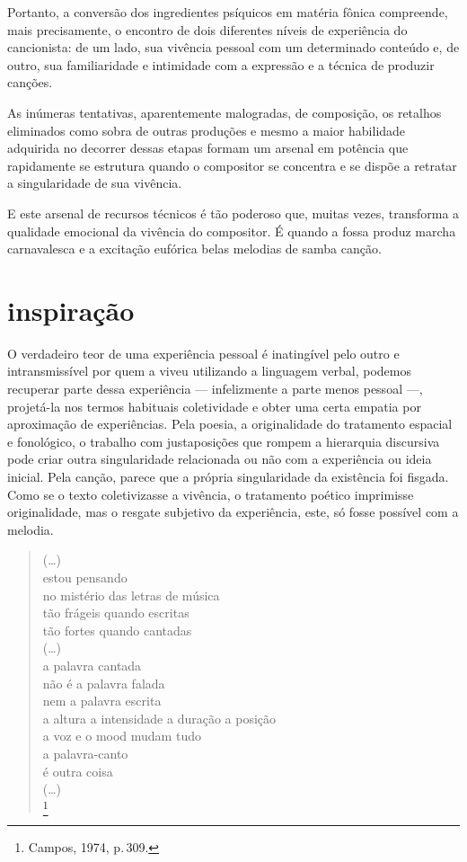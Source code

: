 Portanto, a conversão dos ingredientes psíquicos em matéria fônica
compreende, mais precisamente, o encontro de dois diferentes níveis de
experiência do cancionista: de um lado, sua vivência pessoal com um
determinado conteúdo e, de outro, sua familiaridade e intimidade com a
expressão e a técnica de produzir canções.

As inúmeras tentativas, aparentemente malogradas, de composição, os
retalhos eliminados como sobra de outras produções e mesmo a maior
habilidade adquirida no decorrer dessas etapas formam um arsenal em
potência que rapidamente se estrutura quando o compositor se concentra e
se dispõe a retratar a singularidade de sua vivência.

E este arsenal de recursos técnicos é tão poderoso que, muitas vezes,
transforma a qualidade emocional da vivência do compositor. É quando a
fossa produz marcha carnavalesca e a excitação eufórica belas melodias
de samba canção.

\section{inspiração}

O verdadeiro teor de uma experiência pessoal é inatingível pelo outro e
intransmissível por quem a viveu utilizando a linguagem verbal, podemos
recuperar parte dessa experiência --- infelizmente a parte menos pessoal ---,
projetá-la nos termos habituais coletividade e obter uma certa empatia
por aproximação de experiências. Pela poesia, a originalidade do
tratamento espacial e fonológico, o trabalho com justaposições que
rompem a hierarquia discursiva pode criar outra singularidade
relacionada ou não com a experiência ou ideia inicial. Pela canção,
parece que a própria singularidade da existência foi fisgada. Como se o
texto coletivizasse a vivência, o tratamento poético imprimisse
originalidade, mas o resgate subjetivo da experiência, este, só fosse
possível com a melodia.

\begin{verse}
(\ldots)\\
estou pensando\\
no mistério das letras de música\\
tão frágeis quando escritas\\
tão fortes quando cantadas\\
(\ldots)\\
a palavra cantada\\
não é a palavra falada\\
nem a palavra escrita\\
a altura a intensidade a duração a posição\\
a voz e o mood mudam tudo\\
a palavra-canto\\
é outra coisa\\
(\ldots)\\\footnote{Campos, 1974, p.\,309.}
\end{verse}

